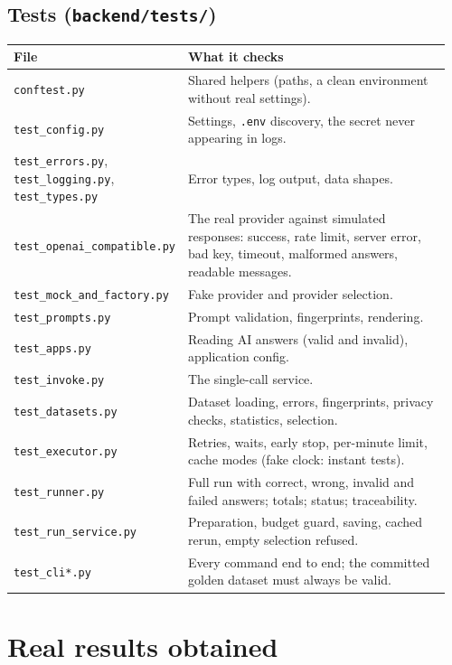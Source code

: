 \documentclass[11pt,a4paper]{article}
\newcommand{\code}[1]{\nolinkurl{#1}}
\begin{document}
\subsection{Tests (\texorpdfstring{\texttt{backend/tests/}}{backend/tests/})}
\begin{longtable}{@{}p{0.34\linewidth}p{0.62\linewidth}@{}}
\toprule
\textbf{File} & \textbf{What it checks} \\
\midrule
\endhead
\code{conftest.py} & Shared helpers (paths, a clean environment without real settings). \\
\code{test_config.py} & Settings, \code{.env} discovery, the secret never appearing in logs. \\
\code{test_errors.py}, \code{test_logging.py}, \code{test_types.py} & Error types, log output, data shapes. \\
\code{test_openai_compatible.py} & The real provider against simulated responses: success, rate limit, server error, bad key, timeout, malformed answers, readable messages. \\
\code{test_mock_and_factory.py} & Fake provider and provider selection. \\
\code{test_prompts.py} & Prompt validation, fingerprints, rendering. \\
\code{test_apps.py} & Reading AI answers (valid and invalid), application config. \\
\code{test_invoke.py} & The single-call service. \\
\code{test_datasets.py} & Dataset loading, errors, fingerprints, privacy checks, statistics, selection. \\
\code{test_executor.py} & Retries, waits, early stop, per-minute limit, cache modes (fake clock: instant tests). \\
\code{test_runner.py} & Full run with correct, wrong, invalid and failed answers; totals; status; traceability. \\
\code{test_run_service.py} & Preparation, budget guard, saving, cached rerun, empty selection refused. \\
\code{test_cli*.py} & Every command end to end; the committed golden dataset must always be valid. \\
\bottomrule
\end{longtable}

\section{Real results obtained}\label{sec:results}
\end{document}

